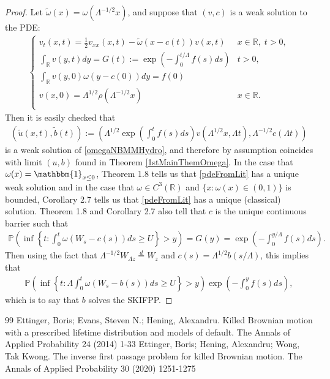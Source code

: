 \documentclass[10pt,a4paper]{amsart}
\newcommand{\B}[1]{\mathbb{#1}}
\newcommand{\is}{\mathbbm{1}}
\begin{document}
\begin{proof}
    Let $\tilde{\omega}(x)=\omega(\Lambda^{-1/2}x)$, and suppose that $(v,c)$ is a weak solution to the PDE:
    \begin{align}\label{pdeFromLit}
    \begin{cases}
        v_t(x,t) = \frac12 v_{xx}(x,t) -\tilde{\omega}(x-c(t))v(x,t) & x\in \B{R},\;t>0,\\
        \int_\B{R} v(y,t)dy = G(t):=\exp(-\int_0^{t/\Lambda}f(s)ds) & t>0,\\
        \int_{\B{R}} v(y,0)\omega(y-c(0))dy=f(0)\\
        v(x,0)=\Lambda^{1/2}\rho(\Lambda^{-1/2}x) & x\in \B{R}.\\
    \end{cases}
    \end{align}
    Then it is easily checked that \begin{align*}(\tilde{u}(x,t),\tilde{b}(t)):=\left(\Lambda^{1/2}\exp(\int_0^t f(s)ds)v(\Lambda^{1/2}x,\Lambda t),\Lambda^{-1/2}c(\Lambda t)\right)\end{align*}
    is a weak solution of \eqref{omegaNBMMHydro}, and therefore by assumption coincides with limit $(u,b)$ found in Theorem \ref{1stMainThemOmega}. In the case that $\omega(x)=\is_{x\leq 0}$, Theorem 1.8 \cite{ettingerHeningKwong} tells us that \eqref{pdeFromLit} has a unique weak solution and in the case that $\omega\in C^3(\B{R})$ and $\{x:\omega(x)\in (0,1)\}$ is bounded, Corollary 2.7 \cite{ettingerHeningEvans} tells us that \eqref{pdeFromLit} has a unique (classical) solution. Theorem 1.8 \cite{ettingerHeningKwong} and Corollary 2.7 \cite{ettingerHeningEvans} also tell that $c$ is the unique continuous barrier such that
    \begin{align*}
    \B{P}\left(\inf\left\{t:\int_0^t \omega(W_s-c(s))ds \geq U\right\}>y\right)=G(y)=\exp(-\int_0^{y/\Lambda}f(s)ds).
    \end{align*}
    Then using the fact that $\Lambda^{-1/2}W_{\Lambda z}\overset{d}{=}W_z$ and $c(s)=\Lambda^{1/2}b(s/\Lambda)$, this implies that
    \begin{align*}
        \B{P}\left(\inf\left\{t:\Lambda \int_0^t \omega(W_s - b(s))ds\geq U\right\}>y\right)\exp(-\int_0^y f(s)ds),
    \end{align*}
    which is to say that $b$ solves the SKIFPP. 
\end{proof}


\begin{thebibliography}{99}
 Ettinger, Boris; Evans, Steven N.; Hening, Alexandru. Killed Brownian motion with a prescribed lifetime distribution and models of default. The Annals of Applied Probability 24 (2014) 1-33
 Ettinger, Boris; Hening, Alexandru; Wong, Tak Kwong. The inverse first passage problem for killed Brownian motion. The Annals of Applied Probability 30 (2020) 1251-1275
\end{thebibliography}
\end{document}
